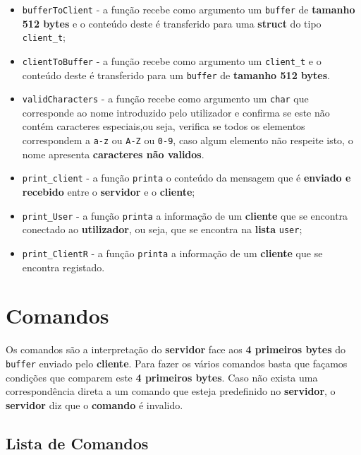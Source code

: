 \documentclass[11pt]{article}   %
\begin{document}
\begin{itemize}
    \item \verb|bufferToClient| - a função recebe como argumento um \verb|buffer| de 
    \textbf{tamanho 512 bytes} e o conteúdo deste é transferido para uma \textbf{struct} do 
    tipo \verb|client_t|;
    \item \verb|clientToBuffer| - a função recebe como argumento um \verb|client_t| e o
    conteúdo deste é transferido para um \verb|buffer| de \textbf{tamanho 512 bytes}.
    \item \verb|validCharacters| - a função recebe como argumento um \verb|char| que corresponde
    ao nome introduzido pelo utilizador e confirma se este não contém caracteres especiais,ou seja,
    verifica se todos os elementos correspondem a \verb|a-z| ou \verb|A-Z| ou \verb|0-9|, caso 
    algum elemento não respeite isto, o nome apresenta \textbf{caracteres não validos}.
    \item \verb|print_client| - a função \verb|printa| o conteúdo da mensagem que é 
    \textbf{enviado e recebido} entre o \textbf{servidor} e o \textbf{cliente};
    \item \verb|print_User| - a função \verb|printa| a informação de um \textbf{cliente}
    que se encontra conectado ao \textbf{utilizador}, ou seja, que se encontra na 
    \textbf{lista} \verb|user|;
    \item \verb|print_ClientR| - a função \verb|printa| a informação de um \textbf{cliente}
    que se encontra registado.
\end{itemize}
\section{Comandos}

Os comandos são a interpretação do \textbf{servidor} face aos \textbf{4 primeiros bytes} do 
\verb|buffer| enviado pelo \textbf{cliente}. Para fazer os vários comandos basta que façamos condições
que comparem este \textbf{4 primeiros bytes}. Caso não exista uma correspondência direta a um
comando que esteja predefinido no \textbf{servidor}, o \textbf{servidor} diz que o \textbf{comando}
é invalido.

\subsection{Lista de Comandos}
\end{document}
